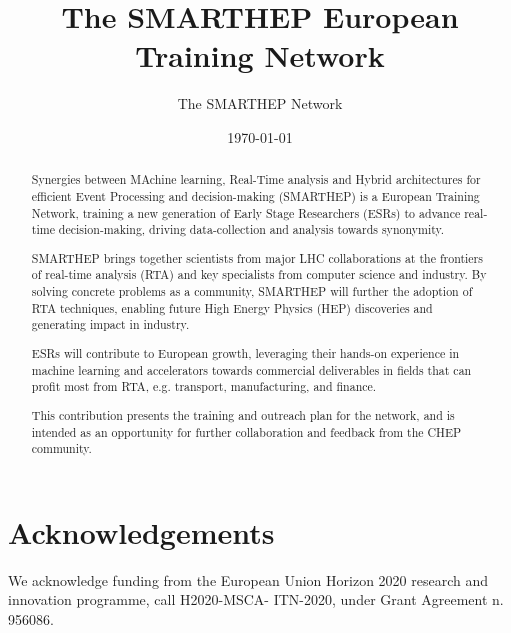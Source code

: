 \documentclass{smarthepnote}
\title{The SMARTHEP European Training Network}
\author{The SMARTHEP Network}
\date{\today}
\begin{document}
\maketitle

\begin{abstract}
    Synergies between MAchine learning, Real-Time analysis and Hybrid architectures for efficient Event Processing and decision-making (SMARTHEP) is a European Training Network, training a new generation of Early Stage Researchers (ESRs) to advance real-time decision-making, driving data-collection and analysis towards synonymity.

    SMARTHEP brings together scientists from major LHC collaborations at the frontiers of real-time analysis (RTA) and key specialists from computer science and industry. By solving concrete problems as a community, SMARTHEP will further the adoption of RTA techniques, enabling future High Energy Physics (HEP) discoveries and generating impact in industry.

    ESRs will contribute to European growth, leveraging their hands-on experience in machine learning and accelerators towards commercial deliverables in fields that can profit most from RTA, e.g. transport, manufacturing, and finance.

    This contribution presents the training and outreach plan for the network, and is intended as an opportunity for further collaboration and feedback from the CHEP community.
\end{abstract}

\vfill
\makereviewtable
\clearpage

















\printbibliography

\section*{Acknowledgements}
We acknowledge funding from the European Union Horizon 2020 research and innovation programme, call H2020-MSCA- ITN-2020, under Grant Agreement n. 956086.
\end{document}
